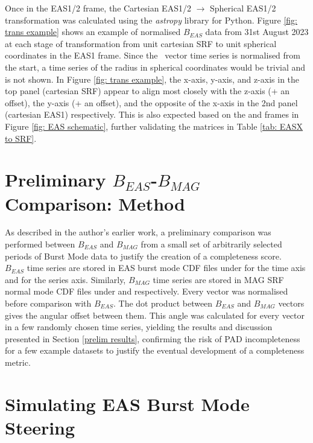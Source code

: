 Once in the EAS1/2 frame, the Cartesian EAS1/2 \(\rightarrow\) Spherical EAS1/2 transformation was calculated using the \textit{astropy} library for Python\cite{astropy2013}\cite{astropy2018}\cite{astropy2022}. Figure \ref{fig: trans example} shows an example of normalised \(B_{EAS}\) data from 31st August 2023 at each stage of transformation from unit cartesian SRF to unit spherical coordinates in the EAS1 frame. Since the \Beas\ vector time series is normalised from the start, a time series of the radius in spherical coordinates would be trivial and is not shown. In Figure \ref{fig: trans example}, the x-axis, y-axis, and z-axis in the top panel (cartesian SRF) appear to align most closely with the z-axis (+ an offset), the y-axis (+ an offset), and the opposite of the x-axis in the 2nd panel (cartesian EAS1) respectively. This is also expected based on the  and  frames in Figure \ref{fig: EAS schematic}, further validating the matrices in Table \ref{tab: EASX to SRF}.
\\


\section{Preliminary \(B_{EAS}\)-\(B_{MAG}\) Comparison: Method}
As described in the author's earlier work, a preliminary comparison was performed between \(B_{EAS}\) and \(B_{MAG}\) from a small set of arbitrarily selected periods of Burst Mode data to justify the creation of a completeness score\cite{dickson2024}.
\\

\(B_{EAS}\) time series are stored in EAS burst mode CDF files under  for the time axis and  for the series axis. Similarly, \(B_{MAG}\) time series are stored in MAG SRF normal mode CDF files under  and  respectively. Every  vector was normalised before comparison with \(B_{EAS}\). The dot product between \(B_{EAS}\) and \(B_{MAG}\) vectors gives the angular offset between them. This angle was calculated for every vector in a few randomly chosen time series, yielding the results and discussion presented in Section \ref{prelim results}, confirming the risk of PAD incompleteness for a few example datasets to justify the eventual development of a completeness metric. 

\section{Simulating EAS Burst Mode Steering} \label{sim steering - method}

